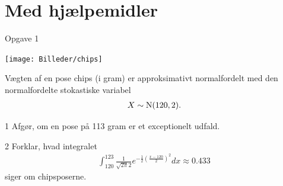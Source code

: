 \documentclass[12pt,x11names,a4paper]{article}
\begin{document}
\newpage

\section*{Med hjælpemidler}
\begin{opgavetekst}{Opgave 1}
	\begin{center}
		\texttt{[image: Billeder/chips]}
	\end{center}
	Vægten af en pose chips (i gram) er approksimativt normalfordelt med den normalfordelte 
	stokastiske variabel
	\begin{align*}
		X \sim \textnormal{N}(120,2).
	\end{align*}
\end{opgavetekst}
\begin{delopgave}{}{1}
	Afgør, om en pose på 113 gram er et exceptionelt udfald.
\end{delopgave}
\begin{delopgave}{}{2}
	Forklar, hvad integralet 
	\begin{align*}
		\int_{120}^{123}\frac{1}{\sqrt{2\pi}2}e^{-\frac{1}{2}\left(\frac{x-120}{2}\right)^2}dx
		\approx 0.433
	\end{align*}
	siger om chipsposerne.
\end{delopgave}
\end{document}
